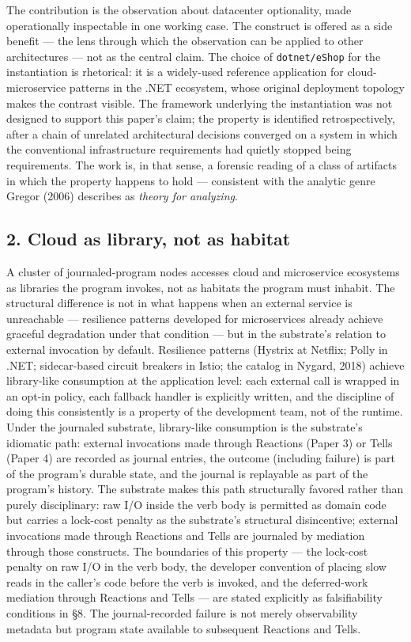 \documentclass[
]{article}
\begin{document}
The contribution is the observation about datacenter optionality, made
operationally inspectable in one working case. The construct is offered
as a side benefit --- the lens through which the observation can be
applied to other architectures --- not as the central claim. The choice
of \texttt{dotnet/eShop} for the instantiation is rhetorical: it is a
widely-used reference application for cloud-microservice patterns in the
.NET ecosystem, whose original deployment topology makes the contrast
visible. The framework underlying the instantiation was not designed to
support this paper's claim; the property is identified retrospectively,
after a chain of unrelated architectural decisions converged on a system
in which the conventional infrastructure requirements had quietly
stopped being requirements. The work is, in that sense, a forensic
reading of a class of artifacts in which the property happens to hold
--- consistent with the analytic genre Gregor (2006) describes as
\emph{theory for analyzing}.

\subsection{2. Cloud as library, not as
habitat}\label{cloud-as-library-not-as-habitat}

A cluster of journaled-program nodes accesses cloud and microservice
ecosystems as libraries the program invokes, not as habitats the program
must inhabit. The structural difference is not in what happens when an
external service is unreachable --- resilience patterns developed for
microservices already achieve graceful degradation under that condition
--- but in the substrate's relation to external invocation by default.
Resilience patterns (Hystrix at Netflix; Polly in .NET; sidecar-based
circuit breakers in Istio; the catalog in Nygard, 2018) achieve
library-like consumption at the application level: each external call is
wrapped in an opt-in policy, each fallback handler is explicitly
written, and the discipline of doing this consistently is a property of
the development team, not of the runtime. Under the journaled substrate,
library-like consumption is the substrate's idiomatic path: external
invocations made through Reactions (Paper 3) or Tells (Paper 4) are
recorded as journal entries, the outcome (including failure) is part of
the program's durable state, and the journal is replayable as part of
the program's history. The substrate makes this path structurally
favored rather than purely disciplinary: raw I/O inside the verb body is
permitted as domain code but carries a lock-cost penalty as the
substrate's structural disincentive; external invocations made through
Reactions and Tells are journaled by mediation through those constructs.
The boundaries of this property --- the lock-cost penalty on raw I/O in
the verb body, the developer convention of placing slow reads in the
caller's code before the verb is invoked, and the deferred-work
mediation through Reactions and Tells --- are stated explicitly as
falsifiability conditions in §8. The journal-recorded failure is not
merely observability metadata but program state available to subsequent
Reactions and Tells.
\end{document}
